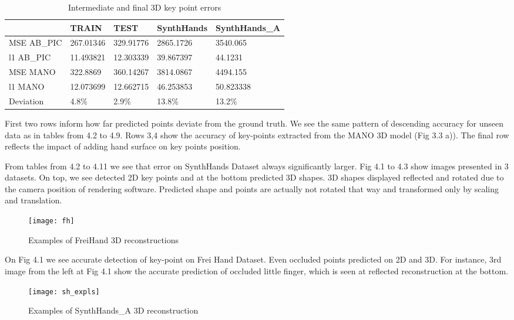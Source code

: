 \begin{table}[H]
\small
\begin{tabularx}{1\textwidth}{bbbbb}
 \hline
 & TRAIN &
   TEST &
   SynthHands &
   SynthHands\_A \\
 \hline
 \hline
MSE AB\_PIC &
267.01346 &
329.91776 &
2865.1726 &
3540.065 

 \\
\hline
l1 AB\_PIC &
11.493821 &
12.303339 &
39.867397 &
44.1231 

\\
\hline
\hline
MSE MANO &
322.8869 &
360.14267 &
3814.0867 &
4494.155 

\\
\hline
l1 MANO &
12.073699 &
12.662715 &
46.253853 &
50.823338 
\\
\hline
\hline
Deviation &
4.8\% &
2.9\% &
13.8\% &
13.2\%
\\
\hline
\end{tabularx}
\caption{\label{tab:res_10}Intermediate and final 3D key point errors}
\end{table}

First two rows inform how far predicted points deviate from the ground truth. We see the same pattern of descending accuracy for unseen data as in tables from 4.2 to 4.9. Rows 3,4 show the accuracy of key-points extracted from the MANO 3D model (Fig 3.3 a)). 
The final row reflects the impact of adding hand surface on key points position.

From tables from 4.2 to 4.11 we see that error on SynthHands Dataset always significantly larger. Fig 4.1 to 4.3 show images presented in 3 datasets. On top, we see detected 2D key points and at the bottom predicted 3D shapes. 3D shapes displayed reflected and rotated due to the camera position of rendering software. Predicted shape and points are actually not rotated that way and transformed only by scaling and translation.

\begin{figure}[H]
\caption{Examples of FreiHand 3D reconstructions}
\centering
\texttt{[image: fh]}
\end{figure}

On Fig 4.1 we see accurate detection of key-point on Frei Hand Dataset. Even occluded points predicted on 2D and 3D. For instance, 3rd image from the left at Fig 4.1 show the accurate prediction of occluded little finger, which is seen at reflected reconstruction at the bottom.

\begin{figure}[H]
\caption{Examples of SynthHands\_A 3D reconstruction}
\centering
\texttt{[image: sh\_expls]}
\end{figure}

